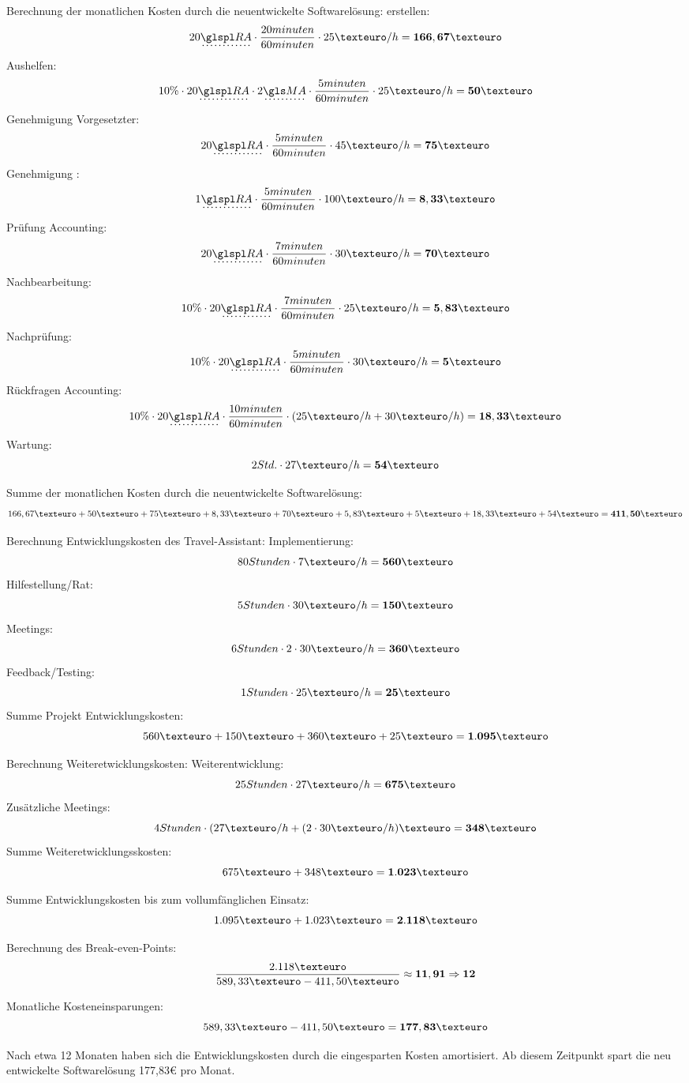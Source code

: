 Berechnung der monatlichen Kosten durch die neuentwickelte Softwarelösung:
	 erstellen: \[ 20 \glp{RA} \cdot \displaystyle\frac{20minuten}{60minuten} \cdot 25€/h =  \bf{166,67€} \]
	Aushelfen: \[ 10\% \cdot 20 \glp{RA} \cdot 2 \gl{MA} \cdot \displaystyle\frac{5minuten}{60minuten} \cdot 25€/h = \bf{50€} \]
	Genehmigung Vorgesetzter:  \[ 20 \glp{RA} \cdot \displaystyle\frac{5minuten}{60minuten} \cdot 45€/h =  \bf{75€} \]
	Genehmigung :  \[ 1 \glp{RA} \cdot \displaystyle\frac{5minuten}{60minuten} \cdot 100€/h =  \bf{8,33€} \]
	Prüfung Accounting: \[ 20 \glp{RA} \cdot \displaystyle\frac{7minuten}{60minuten} \cdot 30€/h =  \bf{70€} \]
	Nachbearbeitung: \[ 10\% \cdot 20 \glp{RA} \cdot \displaystyle\frac{7minuten}{60minuten} \cdot 25€/h =  \bf{5,83€} \]
	Nachprüfung: \[ 10\% \cdot 20 \glp{RA} \cdot \displaystyle\frac{5minuten}{60minuten} \cdot 30€/h =  \bf{5€} \]
	Rückfragen Accounting: \[ 10\% \cdot 20 \glp{RA} \cdot \displaystyle\frac{10minuten}{60minuten} \cdot (25€/h + 30€/h) =  \bf{18,33€} \]
	Wartung: \[ 2 Std. \cdot 27€/h =  \bf{54€} \]
	
Summe der monatlichen Kosten durch die neuentwickelte Softwarelösung: \[166,67€ + 50€ + 75€ + 8,33€ + 70€ + 5,83€ + 5€ + 18,33€ +54€ =  \bf{411,50€} \]

Berechnung Entwicklungskosten des Travel-Assistant:
	Implementierung: \[ 80 Stunden \cdot 7€/h =  \bf{560€} \]
	Hilfestellung/Rat: \[ 5 Stunden \cdot 30€/h =  \bf{150€} \]
	Meetings: \[ 6 Stunden \cdot 2 \cdot 30€/h =  \bf{360€} \]
	Feedback/Testing: \[ 1 Stunden \cdot 25€/h =  \bf{25€} \]
Summe Projekt Entwicklungskosten: \[560€ + 150€ + 360€ + 25€ =  \bf{1.095€} \]

Berechnung Weiteretwicklungskosten:
	Weiterentwicklung: \[ 25 Stunden \cdot 27€/h =  \bf{675€} \]
	Zusätzliche Meetings: \[ 4 Stunden \cdot ( 27€/h + ( 2 \cdot 30€/h)€ =  \bf{348€} \]
Summe Weiteretwicklungsskosten: \[675€ + 348€ =  \bf{1.023€} \]

Summe Entwicklungskosten bis zum vollumfänglichen Einsatz: \[1.095€ + 1.023€ =  \bf{2.118€} \]

Berechnung des Break-even-Points: \[ \displaystyle\frac{2.118€}{589,33€ - 411,50€} \approx  \bf{11,91} \Rightarrow 12 \] 

Monatliche Kosteneinsparungen:
\[ 589,33€ - 411,50€ =  \bf{177,83€} \]

Nach etwa 12 Monaten haben sich die Entwicklungskosten durch die eingesparten Kosten amortisiert. Ab diesem Zeitpunkt spart die neu entwickelte Softwarelösung 177,83€ pro Monat.